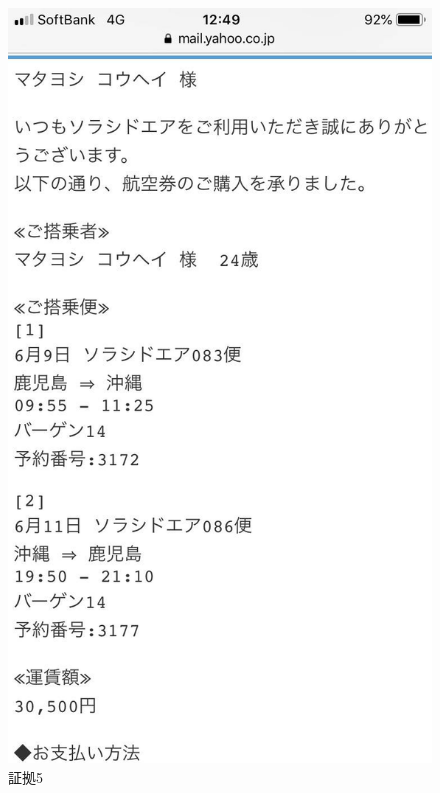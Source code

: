 \begin{figure}[H]
  \centering
  \includegraphics[clip,scale=0.2]{./section/Taira/figures/fig5}
  \caption{証拠5}
\label{fig5}
\end{figure}


